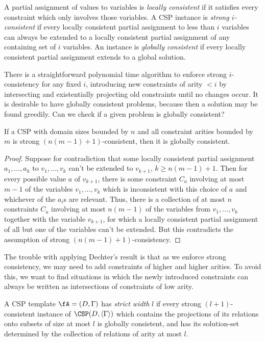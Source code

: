 \begin{defn} A partial assignment of values to variables is \emph{locally consistent} if it satisfies every constraint which only involves those variables. A CSP instance is \emph{strong $i$-consistent} if every locally consistent partial assignment to less than $i$ variables can always be extended to a locally consistent partial assignment of any containing set of $i$ variables. An instance is \emph{globally consistent} if every locally consistent partial assignment extends to a global solution.
\end{defn}

There is a straightforward polynomial time algorithm to enforce strong $i$-consistency for any fixed $i$, introducing new constraints of arity $< i$ by intersecting and existentially projecting old constraints until no changes occur. It is desirable to have globally consistent problems, because then a solution may be found greedily. Can we check if a given problem is globally consistent?

\begin{thm} If a CSP with domain sizes bounded by $n$ and all constraint arities bounded by $m$ is strong $(n(m-1)+1)$-consistent, then it is globally consistent.
\end{thm}
\begin{proof} Suppose for contradiction that some locally consistent partial assignment $a_1, ..., a_k$ to $v_1, ..., v_k$ can't be extended to $v_{k+1}$, $k \ge n(m-1)+1$. Then for every possible value $a$ of $v_{k+1}$, there is some constraint $C_a$ involving at most $m-1$ of the variables $v_1, ..., v_k$ which is inconsistent with this choice of $a$ and whichever of the $a_i$s are relevant. Thus, there is a collection of at most $n$ constraints $C_a$ involving at most $n(m-1)$ of the variables from $v_1, ..., v_k$ together with the variable $v_{k+1}$, for which a locally consistent partial assignment of all but one of the variables can't be extended. But this contradicts the assumption of strong $(n(m-1)+1)$-consistency.
\end{proof}

The trouble with applying Dechter's result is that as we enforce strong consistency, we may need to add constraints of higher and higher arities. To avoid this, we want to find situations in which the newly introduced constraints can always be written as intersections of constraints of low arity.

\begin{defn} A CSP template $\fA = (D, \Gamma)$ has \emph{strict width} $l$ if every strong $(l+1)$-consistent instance of $\CSP(D, \langle \Gamma \rangle)$ which contains the projections of its relations onto subsets of size at most $l$ is globally consistent, and has its solution-set determined by the collection of relations of arity at most $l$.%
\end{defn}

